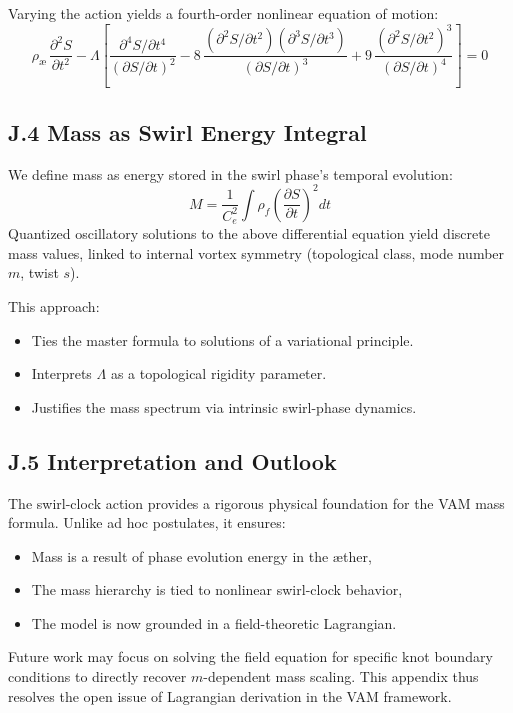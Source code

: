 Varying the action yields a fourth-order nonlinear equation of motion:
\[
\rho_{\text{\ae}} \, \frac{\partial^2 S}{\partial t^2}
- \Lambda \left[
\frac{\partial^4 S / \partial t^4}{\left(\partial S / \partial t\right)^2}
- 8 \, \frac{ \left( \partial^2 S / \partial t^2 \right) \left( \partial^3 S / \partial t^3 \right) }{ \left(\partial S / \partial t\right)^3 }
+ 9 \, \frac{ \left( \partial^2 S / \partial t^2 \right)^3 }{ \left(\partial S / \partial t\right)^4 }
\right] = 0
\]

\subsection*{J.4 Mass as Swirl Energy Integral}

We define mass as energy stored in the swirl phase's temporal evolution:
\[
M = \frac{1}{C_e^2} \int \rho_{\scriptscriptstyle\boldsymbol\!f} \left( \frac{\partial S}{\partial t} \right)^2 dt
\]
Quantized oscillatory solutions to the above differential equation yield discrete mass values, linked to internal vortex symmetry (topological class, mode number $m$, twist $s$).

This approach:
\begin{itemize}
    \item Ties the master formula to solutions of a variational principle.
    \item Interprets $\Lambda$ as a topological rigidity parameter.
    \item Justifies the mass spectrum via intrinsic swirl-phase dynamics.
\end{itemize}

\subsection*{J.5 Interpretation and Outlook}

The swirl-clock action provides a rigorous physical foundation for the VAM mass formula. Unlike ad hoc postulates, it ensures:
\begin{itemize}
    \item Mass is a result of phase evolution energy in the æther,
    \item The mass hierarchy is tied to nonlinear swirl-clock behavior,
    \item The model is now grounded in a field-theoretic Lagrangian.
\end{itemize}

Future work may focus on solving the field equation for specific knot boundary conditions to directly recover $m$-dependent mass scaling. This appendix thus resolves the open issue of Lagrangian derivation in the VAM framework.